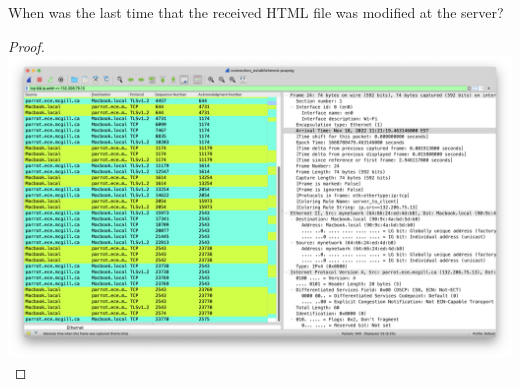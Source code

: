 \documentclass[../../main.tex]{subfiles}
\begin{document}
\begin{wts}
When was the last time that the received HTML file was modified at the server?
\end{wts}
\begin{proof}
\includegraphics[width=\textwidth]{subfiles/images/RETRANSMISSION_ACK_GRAPHIC_2.png}



\end{proof}
\end{document}
